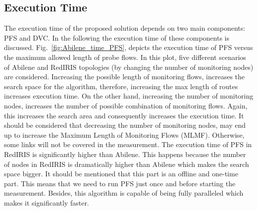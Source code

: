 \documentclass[10pt, journal, letterpaper]{IEEEtran}
\begin{document}
\subsection{Execution Time}\label{subsec:eval_exec_time}
The execution time of the proposed solution depends on two main components: PFS and DVC. In the following the execution time of these components is discussed. Fig.~\ref{fig:Abilene_time_PFS}, depicts the execution time of PFS versus the maximum allowed length of probe flows. In this plot, five different scenarios of Abilene and RedIRIS topologies (by changing the number of monitoring nodes) are considered. Increasing the possible length of monitoring flows, increases the search space for the algorithm, therefore, increasing the max length of routes increases execution time. On the other hand, increasing the number of monitoring nodes, increases the number of possible combination of monitoring flows. Again, this increases the search area and consequently increases the execution time. It should be considered that decreasing the number of monitoring nodes, may end up to increase the Maximum Length of Monitoring Flows (MLMF). Otherwise, some links will not be covered in the measurement. The execution time of PFS in RedIRIS is significantly higher than Abilene. This happens because the number of nodes in RedIRIS is dramatically higher than Abilene which makes the search space bigger. It should be mentioned that this part is an offline and one-time part. This means that we need to run PFS just once and before starting the measurement. Besides, this algorithm is capable of being fully paralleled which makes it significantly faster.
\end{document}

